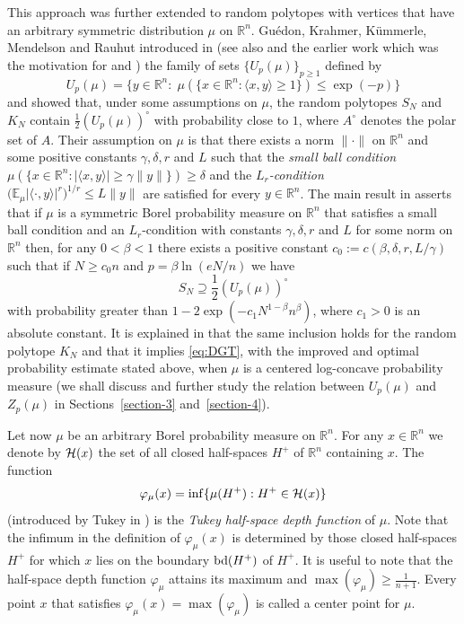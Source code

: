 \documentclass[11pt,leqno]{article}
\theoremstyle{definition}
\theoremstyle{remark}
\numberwithin{equation}{section}
\newcommand{\ls}{\leqslant}
\newcommand{\gr}{\geqslant}
\newcommand{\1}{\textbf{1}}
\begin{document}
This approach was further extended to random polytopes with vertices that have an arbitrary symmetric
distribution $\mu$ on $\mathbb{R}^n$. Gu\'{e}don, Krahmer, K\"{u}mmerle, Mendelson and Rauhut introduced
in \cite{GKKMR-2022} (see also \cite{Mendelson-2020} and the earlier work \cite{GLT-2020} which was
the motivation for \cite{Mendelson-2020} and \cite{GKKMR-2022}) the family of sets $\{U_p(\mu)\}_{p\gr 1}$ defined by
\begin{equation}\label{eq:def-U}U_p(\mu)=\{y\in \mathbb{R}^n:\;\mu(\{x\in\mathbb{R}^n:\langle x,y\rangle\gr 1\})
\ls \exp(-p)\}\end{equation}
and showed that, under some assumptions on $\mu$, the random polytopes $S_N$ and $K_N$ contain
$\frac{1}{2}(U_p(\mu))^{\circ}$ with probability close to $1$, where $A^{\circ}$ denotes the polar set of $A$.
Their assumption on $\mu$ is that there exists a norm $\|\cdot\|$ on $\mathbb{R}^n$ and some positive constants
$\gamma,\delta,r$ and $L$ such that the {\it small ball condition}
$\mu(\{x\in\mathbb{R}^n:|\langle x,y\rangle |\gr\gamma\|y\|\})\gr\delta $ and the {\it $L_r$-condition}
$\big(\mathbb{E}_{\mu}|\langle \cdot ,y\rangle |^r\big)^{1/r}\ls L\|y\|$ are satisfied for every $y\in\mathbb{R}^n$.
The main result in \cite{GKKMR-2022} asserts that if $\mu$ is a symmetric Borel probability measure on $\mathbb{R}^n$
that satisfies a small ball condition and an $L_r$-condition with constants $\gamma,\delta, r$ and $L$ for some
norm on $\mathbb{R}^n$ then, for any $0<\beta<1$ there exists a positive constant $c_0:=c(\beta,\delta,r,L/\gamma)$ such
that if $N\gr c_0n$ and $p=\beta\ln(eN/n)$ we have
\begin{equation}\label{eq:GKKMR}S_N\supseteq\frac{1}{2}(U_p(\mu))^{\circ}\end{equation}
with probability greater than $1-2\exp(-c_1N^{1-\beta}n^{\beta})$, where $c_1>0$ is an absolute constant.
It is explained in \cite{GKKMR-2022} that the same inclusion holds for the random polytope $K_N$
and that it implies \eqref{eq:DGT}, with the improved and optimal probability estimate stated above,
when $\mu$ is a centered log-concave probability measure (we shall discuss and further study the relation
between $U_p(\mu)$ and $Z_p(\mu)$ in Sections~\ref{section-3} and~\ref{section-4}).

Let now $\mu$ be an arbitrary Borel probability measure on $\mathbb{R}^n$. For any $x\in {\mathbb R}^n$ we denote by ${\cal H}(x)$ the set
of all closed half-spaces $H^+$ of ${\mathbb R}^n$ containing $x$. The function
$$\varphi_{\mu }(x)=\inf\{\mu (H^+):H^+\in {\cal H}(x)\}$$
(introduced by Tukey in \cite{Tukey-1975}) is the {\it Tukey half-space depth function} of $\mu$.
Note that the infimum in the definition of $\varphi_{\mu}(x)$
is determined by those closed half-spaces $H^+$ for which $x$ lies on the boundary ${\rm bd}(H^+)$ of $H^+$.
It is useful to note that the half-space depth function $\varphi_{\mu}$ attains its maximum
and $\max(\varphi_{\mu})\gr\frac{1}{n+1}$. Every point $x$ that satisfies $\varphi_{\mu}(x)=\max(\varphi_{\mu})$ is called a
center point for $\mu$.
\end{document}
